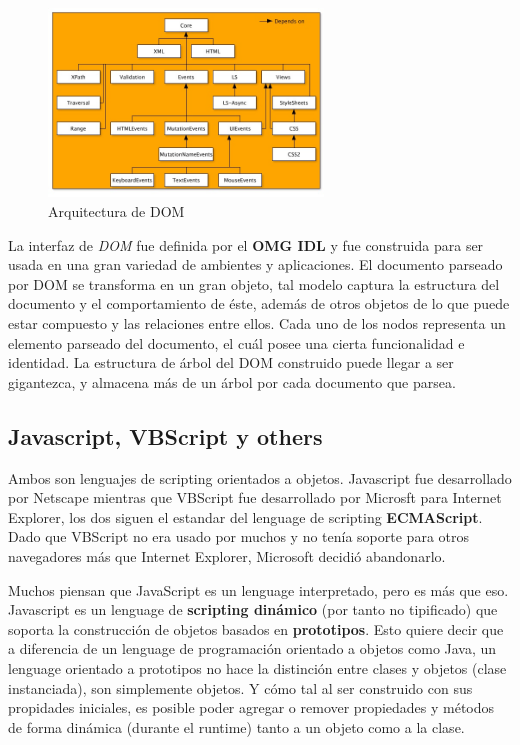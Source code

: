     \begin{figure}[h]
        \centering
        \includegraphics[width=0.65\textwidth]{figures/dom-architecture.jpg}
        \caption{Arquitectura de DOM \cite{w3c}}
        \label{fig:DOM}
    \end{figure}
            
    La interfaz de \textit{DOM} fue definida por el \textbf{OMG IDL} y fue construida para ser usada en una gran variedad de ambientes y aplicaciones. El documento parseado por DOM se transforma en un gran objeto, tal modelo captura la estructura del documento y el comportamiento de éste, además de otros objetos de lo que puede estar compuesto y las relaciones entre ellos. Cada uno de los nodos representa un elemento parseado del documento, el cuál posee una cierta funcionalidad e identidad. La estructura de árbol del DOM construido puede llegar a ser gigantezca, y almacena más de un árbol por cada documento que parsea. 
            
    \subsection{Javascript, VBScript y others}
    \label{chap2:JS}
    Ambos son lenguajes de scripting orientados a objetos. Javascript fue desarrollado por Netscape mientras que VBScript fue desarrollado por Microsft para Internet Explorer, los dos siguen el estandar del lenguage de scripting \textbf{ECMAScript}. Dado que VBScript no era usado por muchos y no tenía soporte para otros navegadores más que Internet Explorer, Microsoft decidió abandonarlo.

    Muchos piensan que JavaScript es un lenguage interpretado, pero es más que eso. Javascript es un lenguage de \textbf{scripting dinámico} (por tanto no tipificado) que soporta la construcción de objetos basados en \textbf{prototipos}. Esto quiere decir que a diferencia de un lenguage de programación orientado a objetos como Java, un lenguage orientado a prototipos no hace la distinción entre clases y objetos (clase instanciada), son simplemente objetos. Y cómo tal al ser construido con sus propidades iniciales, es posible poder agregar o remover propiedades y métodos de forma dinámica (durante el runtime) tanto a un objeto como a la clase.
            
